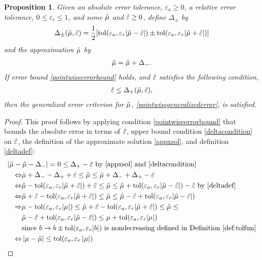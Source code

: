 \documentclass{iitthesis}
\newtheorem{proposition}[theorem]{Proposition}
\theoremstyle{definition}
\begin{document}
\begin{proposition}\label{meanMCgProp}
Given an absolute error tolerance, $\varepsilon_a\geq 0$, a relative error tolerance, $0 \leq \varepsilon_r\le 1$, and some $\hat{\mu}$ and $\hat{\varepsilon}\geq 0$, define $\Delta_\pm$ by
\begin{align}\Delta_{\pm}(\hat{\mu},\hat{\varepsilon}) = \frac{1}{2} [\operatorname{tol}(\varepsilon_a, \varepsilon_r |\hat{\mu}-\hat{\varepsilon}|) \pm \operatorname{tol}(\varepsilon_a, \varepsilon_r |\hat{\mu}+\hat{\varepsilon}|)] \label{deltadef}
\end{align}
and the approximation $\tilde{\mu}$ by
\begin{align}
\tilde{\mu} = \hat{\mu} + \Delta_{-}. \label{appxsol}
\end{align}
If error bound \eqref{pointwiseerrorbound} holds, and $\hat{\varepsilon}$ satisfies the following condition,
\begin{align}
\hat{\varepsilon}\leq \Delta_{+}(\hat{\mu},\hat{\varepsilon}),\label{deltacondition}
\end{align}
 then the generalized error criterion for $\tilde{\mu}$, \eqref{pointwisegeneralizederror}, is satisfied. 
 \end{proposition}
 \begin{proof}
 This proof follows by applying condition \eqref{pointwiseerrorbound} that bounds the absolute error in terms of $\hat{\varepsilon}$, upper bound condition \eqref{deltacondition} on $\hat{\varepsilon}$, the definition of the approximate solution \eqref{appxsol}, and definition \eqref{deltadef}:
\begin{align*}
\MoveEqLeft
|\tmu -\hmu - \Delta_{-}| = 0 \leq \Delta_{+}- \hat{\varepsilon}  \text{ by } \eqref{appxsol} \text{ and } \eqref{deltacondition} \\ 
\Leftrightarrow 
&\hmu+\Delta_- - \Delta_{+} + \hat{\varepsilon} \leq \tilde{\mu}  \leq \hat{\mu} +\Delta_{-}+\Delta_{+}-\hat{\varepsilon} \\ \Leftrightarrow 
&\hat{\mu} -\text{tol} (\varepsilon_a, \varepsilon_r |\hat{\mu} +\hat{\varepsilon}|)+ \hat{\varepsilon} \leq \tilde{\mu}  \leq \hat{\mu}  +\text{tol} (\varepsilon_a, \varepsilon_r |\hat{\mu} -\hat{\varepsilon} |)-\hat{\varepsilon}  \text{ by } \eqref{deltadef}\\
\Leftrightarrow 
&\hat{\mu} + \hat{\varepsilon}  -\text{tol} (\varepsilon_a, \varepsilon_r |\hat{\mu} +\hat{\varepsilon} |) \leq \tilde{\mu}  \leq \hat{\mu} -\hat{\varepsilon} +\text{tol} (\varepsilon_a, \varepsilon_r |\hat{\mu} -\hat{\varepsilon} |) \\
\Rightarrow &
\mu -\text{tol} (\varepsilon_a, \varepsilon_r |\mu|) \leq\hat{\mu} + \hat{\varepsilon}  -\text{tol} (\varepsilon_a, \varepsilon_r |\hat{\mu} +\hat{\varepsilon} |) \leq \tilde{\mu}  \leq \\
& \hat{\mu} -\hat{\varepsilon} +\text{tol} (\varepsilon_a, \varepsilon_r |\hat{\mu} -\hat{\varepsilon} |)  \leq \mu+\text{tol} (\varepsilon_a, \varepsilon_r |\mu|) \\
& \text{since } b \to b \pm \tol (\varepsilon_a,\varepsilon_r |b|) \text{ is nondecreasing defined in Definition \ref{def:tolfun}}\\ 
\Leftrightarrow &
\abs{\mu-\tmu} \leq \tol(\varepsilon_a, \varepsilon_r \abs{\mu}) 
\end{align*}
\end{proof}
\end{document}
